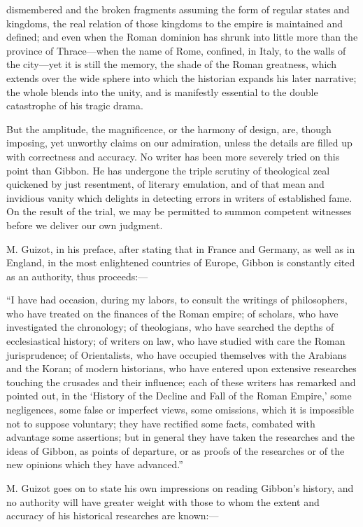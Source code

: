 dismembered and the broken fragments assuming the form of regular states and kingdoms, the real relation of those kingdoms to the empire is maintained and defined; and even when the Roman dominion has shrunk into little more than the province of Thrace—when the name of Rome, confined, in Italy, to the walls of the city—yet it is still the memory, the shade of the Roman greatness, which extends over the wide sphere into which the historian expands his later narrative; the whole blends into the unity, and is manifestly essential to the double catastrophe of his tragic drama.

But the amplitude, the magnificence, or the harmony of design, are, though imposing, yet unworthy claims on our admiration, unless the details are filled up with correctness and accuracy. No writer has been more severely tried on this point than Gibbon. He has undergone the triple scrutiny of theological zeal quickened by just resentment, of literary emulation, and of that mean and invidious vanity which delights in detecting errors in writers of established fame. On the result of the trial, we may be permitted to summon competent witnesses before we deliver our own judgment.

M. Guizot, in his preface, after stating that in France and Germany, as well as in England, in the most enlightened countries of Europe, Gibbon is constantly cited as an authority, thus proceeds:—

“I have had occasion, during my labors, to consult the writings of philosophers, who have treated on the finances of the Roman empire; of scholars, who have investigated the chronology; of theologians, who have searched the depths of ecclesiastical history; of writers on law, who have studied with care the Roman jurisprudence; of Orientalists, who have occupied themselves with the Arabians and the Koran; of modern historians, who have entered upon extensive researches touching the crusades and their influence; each of these writers has remarked and pointed out, in the ‘History of the Decline and Fall of the Roman Empire,’ some negligences, some false or imperfect views, some omissions, which it is impossible not to suppose voluntary; they have rectified some facts, combated with advantage some assertions; but in general they have taken the researches and the ideas of Gibbon, as points of departure, or as proofs of the researches or of the new opinions which they have advanced.”

M. Guizot goes on to state his own impressions on reading Gibbon’s history, and no authority will have greater weight with those to whom the extent and accuracy of his historical researches are known:—

